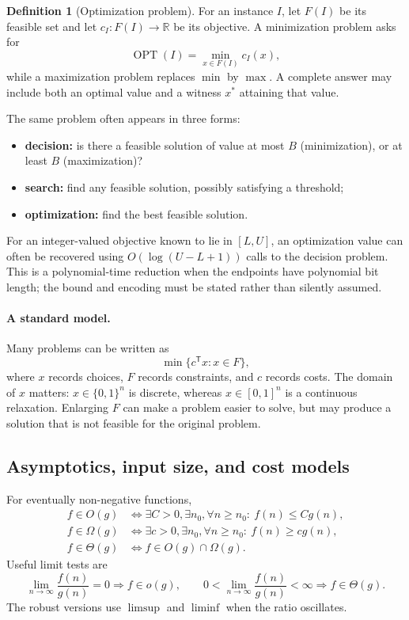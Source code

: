 \documentclass[10pt]{article}
\theoremstyle{definition}
\newtheorem{definition}{Definition}[section]
\newcommand{\OPT}{\operatorname{OPT}}
\begin{document}
\begin{definition}[Optimization problem]
For an instance $I$, let $F(I)$ be its feasible set and let
$c_I\colon F(I)\to\mathbb{R}$ be its objective.  A minimization problem asks
for
\[
  \OPT(I)=\min_{x\in F(I)}c_I(x),
\]
while a maximization problem replaces $\min$ by $\max$.  A complete answer may
include both an optimal value and a witness $x^*$ attaining that value.
\end{definition}

The same problem often appears in three forms:
\begin{itemize}
  \item \textbf{decision:} is there a feasible solution of value at most $B$
        (minimization), or at least $B$ (maximization)?
  \item \textbf{search:} find any feasible solution, possibly satisfying a
        threshold;
  \item \textbf{optimization:} find the best feasible solution.
\end{itemize}
For an integer-valued objective known to lie in $[L,U]$, an optimization value
can often be recovered using $O(\log(U-L+1))$ calls to the decision problem.
This is a polynomial-time reduction when the endpoints have polynomial bit
length; the bound and encoding must be stated rather than silently assumed.

\paragraph{A standard model.}
Many problems can be written as
\[
  \min\{c^{\mathsf T}x:x\in F\},
\]
where $x$ records choices, $F$ records constraints, and $c$ records costs.
The domain of $x$ matters: $x\in\{0,1\}^n$ is discrete, whereas
$x\in[0,1]^n$ is a continuous relaxation.  Enlarging $F$ can make a problem
easier to solve, but may produce a solution that is not feasible for the
original problem.

\subsection{Asymptotics, input size, and cost models}

For eventually non-negative functions,
\begin{align*}
f\in O(g)
&\iff \exists C>0,\exists n_0,\forall n\ge n_0:\ f(n)\le Cg(n),\\
f\in \Omega(g)
&\iff \exists c>0,\exists n_0,\forall n\ge n_0:\ f(n)\ge cg(n),\\
f\in \Theta(g)
&\iff f\in O(g)\cap\Omega(g).
\end{align*}
Useful limit tests are
\[
\lim_{n\to\infty}\frac{f(n)}{g(n)}=0\Rightarrow f\in o(g),\qquad
0<\lim_{n\to\infty}\frac{f(n)}{g(n)}<\infty\Rightarrow f\in\Theta(g).
\]
The robust versions use $\limsup$ and $\liminf$ when the ratio oscillates.
\end{document}
